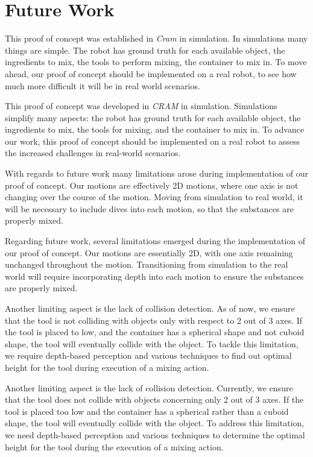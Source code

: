 \section{Future Work}
This proof of concept was established in \textit{Cram} in simulation. In simulations many things are simple.
The robot has ground truth for each available object, the ingredients to mix, the tools to perform mixing, the container to mix in. 
To move ahead, our proof of concept should be implemented on a real robot, to see how much more difficult it will 
be in real world scenarios.

This proof of concept was developed in \textit{CRAM} in simulation. Simulations simplify many aspects: the robot has ground truth for each available object, the ingredients to mix, the tools for mixing, and the container to mix in. To advance our work, this proof of concept should be implemented on a real robot to assess the increased challenges in real-world scenarios.


With regards to future work many limitations arose during implementation of our proof of concept.
Our motions are effectively 2D motions, where one axis is not changing over the course of the motion.
Moving from simulation to real world, it will be necessary to include dives into each motion, so that 
the substances are properly mixed. 

Regarding future work, several limitations emerged during the implementation of our proof of concept. Our motions are essentially 2D, with one axis remaining unchanged throughout the motion. Transitioning from simulation to the real world will require incorporating depth into each motion to ensure the substances are properly mixed.

Another limiting aspect is the lack of collision detection. As of now, we ensure that the tool is not colliding 
with objects only with respect to 2 out of 3 axes. If the tool is placed to low, and the container has a spherical shape and not 
cuboid shape, the tool will eventually collide with the object. To tackle this limitation, we require depth-based perception
and various techniques to find out optimal height for the tool during execution of a mixing action.

Another limiting aspect is the lack of collision detection. Currently, we ensure that the tool does not collide with objects concerning only 2 out of 3 axes. If the tool is placed too low and the container has a spherical rather than a cuboid shape, the tool will eventually collide with the object. To address this limitation, we need depth-based perception and various techniques to determine the optimal height for the tool during the execution of a mixing action.


